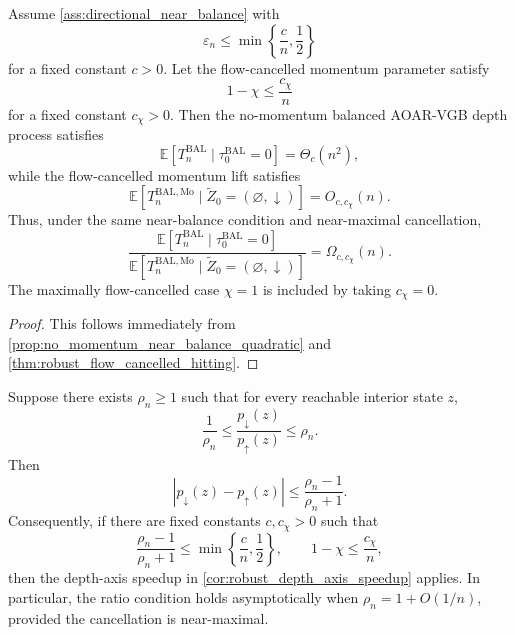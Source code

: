\documentclass{article}
\numberwithin{theorem}{section}
\numberwithin{proposition}{section}
\numberwithin{corollary}{section}
\numberwithin{lemma}{section}
\numberwithin{conjecture}{section}
\numberwithin{remark}{section}
\numberwithin{definition}{section}
\numberwithin{assumption}{section}
\numberwithin{example}{section}
\newcommand{\bbE}{\mathbb{E}}
\newcommand{\lbra}[1]{\left[#1\right]}
\newcommand{\abs}[1]{\left| #1\right|}
\begin{document}
\begin{corollary}
\label{cor:robust_depth_axis_speedup}
Assume \cref{ass:directional_near_balance} with
\begin{equation*}
    \varepsilon_n\le \min\left\{\frac{c}{n},\frac12\right\}
\end{equation*}
for a fixed constant $c>0$. Let the flow-cancelled momentum parameter satisfy
\begin{equation*}
    1-\chi\le \frac{c_\chi}{n}
\end{equation*}
for a fixed constant $c_\chi>0$. Then the no-momentum balanced AOAR-VGB depth
process satisfies
\begin{equation*}
    \bbE\lbra{T_n^{\mathrm{BAL}}\mid \tau_0^{\mathrm{BAL}}=0}
    =
    \Theta_c(n^2),
\end{equation*}
while the flow-cancelled momentum lift satisfies
\begin{equation*}
    \bbE\lbra{
        T_n^{\mathrm{BAL,Mo}}
        \mid
        \widetilde Z_0=(\varnothing,\downarrow)
    }
    =
    O_{c,c_\chi}(n).
\end{equation*}
Thus, under the same near-balance condition and near-maximal cancellation,
\begin{equation*}
    \frac{
        \bbE[T_n^{\mathrm{BAL}}\mid \tau_0^{\mathrm{BAL}}=0]
    }{
        \bbE[T_n^{\mathrm{BAL,Mo}}\mid
        \widetilde Z_0=(\varnothing,\downarrow)]
    }
    =
    \Omega_{c,c_\chi}(n).
\end{equation*}
The maximally flow-cancelled case $\chi=1$ is included by taking
$c_\chi=0$.
\end{corollary}

\begin{proof}
This follows immediately from \cref{prop:no_momentum_near_balance_quadratic} and \cref{thm:robust_flow_cancelled_hitting}.
\end{proof}

\begin{corollary}
\label{cor:ratio_form_robust_speedup}
Suppose there exists $\rho_n\ge1$ such that for every reachable interior state $z$,
\begin{equation*}
    \frac{1}{\rho_n}\le \frac{p_{\downarrow}(z)}{p_{\uparrow}(z)}\le \rho_n.
\end{equation*}
Then
\begin{equation*}
    \abs{p_{\downarrow}(z)-p_{\uparrow}(z)}\le \frac{\rho_n-1}{\rho_n+1}.
\end{equation*}
Consequently, if there are fixed constants $c,c_\chi>0$ such that
\begin{equation*}
    \frac{\rho_n-1}{\rho_n+1}
    \le
    \min\left\{\frac{c}{n},\frac12\right\},
    \qquad
    1-\chi\le \frac{c_\chi}{n},
\end{equation*}
then the depth-axis speedup in
\cref{cor:robust_depth_axis_speedup} applies. In particular, the ratio condition
holds asymptotically when $\rho_n=1+O(1/n)$, provided the cancellation is
near-maximal.
\end{corollary}
\end{document}
